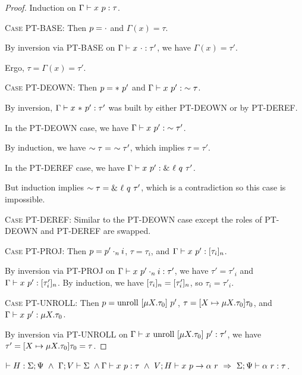 \documentclass{article}
\begin{document}
\begin{proof}
  Induction on ${{\Gamma}} \vdash {{x}\ {p}} : {{\tau}}$.

  \textsc{Case PT-BASE}:
    Then $p = \cdot$ and $\Gamma(x) = \tau$.

    By inversion via \textsc{PT-BASE} on ${{\Gamma}} \vdash {{x}\ {\cdot}} : {{\tau'}}$,
    we have $\Gamma(x) = \tau'$.
    
    Ergo, $\tau = \Gamma(x) = \tau'$.

  \textsc{Case PT-DEOWN}:
    Then $p = *\ {p'}$ and ${{\Gamma}} \vdash {{x}\ {p'}} : {{\sim {\tau}}}$.

    By inversion, ${{\Gamma}} \vdash {{x}\ {*\ {p'}}} : {{\tau'}}$ was built by either \textsc{PT-DEOWN}
    or by \textsc{PT-DEREF}.

    In the \textsc{PT-DEOWN} case, we have ${{\Gamma}} \vdash {{x}\ {p'}} : {{\sim {\tau'}}}$.

    By induction, we have $\Own{\tau} =\ \Own{\tau'}$, which implies $\tau = \tau'$.

    In the \textsc{PT-DEREF} case, we have ${{\Gamma}} \vdash {{x}\ {p'}} : {{\&\ {\ell}\ {q}\ {\tau'}}}$.

    But induction implies $\sim {\tau} = \&\ {\ell}\ {q}\ {\tau'}$, which is a contradiction
    so this case is impossible.

  \textsc{Case PT-DEREF}:
    Similar to the \textsc{PT-DEOWN} case except the roles of \textsc{PT-DEOWN}
    and \textsc{PT-DEREF} are swapped.

  \textsc{Case PT-PROJ}:
    Then $p = {p'}\cdot_{n} {i}$, $\tau = \tau_i$, and ${{\Gamma}} \vdash {{x}\ {p'}} : {{[ {\tau_i} ]_{n}}}$.

    By inversion via \textsc{PT-PROJ} on ${{\Gamma}} \vdash {{x}\ {{p'}\cdot_{n} {i}}} : {{\tau'}}$,
    we have $\tau' = \tau'_i$ and ${{\Gamma}} \vdash {{x}\ {p'}} : {{[ {\tau'_i} ]_{n}}}$.
    By induction, we have $[ {\tau_i} ]_{n} = [ {\tau'_i} ]_{n}$, so $\tau_i = \tau'_i$.

  \textsc{Case PT-UNROLL}:
    Then $p = \textrm{unroll}\ [{\mu {X}.{\tau_0}}]\ {p'}$, $\tau = [{X} \mapsto {\mu {X}.{\tau_0}}]{\tau_0}$,
    and ${{\Gamma}} \vdash {{x}\ {p'}} : {{\mu {X}.{\tau_0}}}$.

    By inversion via \textsc{PT-UNROLL} on
    ${{\Gamma}} \vdash {{x}\ {\textrm{unroll}\ [{\mu {X}.{\tau_0}}]\ {p'}}} : {{\tau'}}$, we have
    $\tau' = [{X} \mapsto {\mu {X}.{\tau_0}}]{\tau_0} = \tau$.

\end{proof}

\begin{lem}
  $\HWF{H}{\Sigma}{\Psi}\ \land\ \SWF{\Gamma}{V}{\Sigma}\ \land\ \\
   \PType{\Gamma}{x}{p}{\tau}\ \land\ \PEval{V}{H}{x}{p}{\alpha}{r}\ \Rightarrow\
   \ARType{\Sigma}{\Psi}{\alpha}{r}{\tau}$.
\end{lem}
\end{document}
